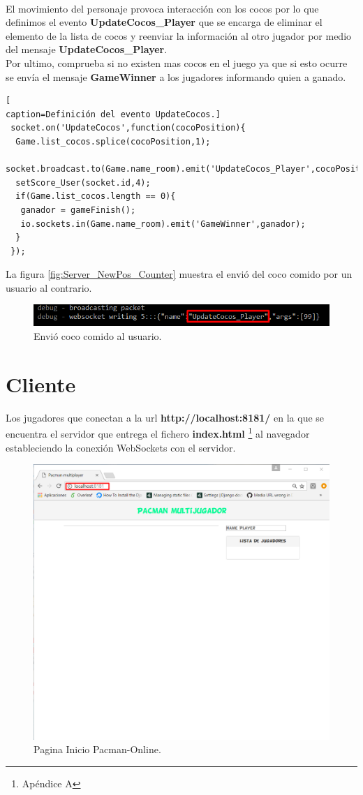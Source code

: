 \\El movimiento del personaje provoca interacción con los cocos por lo que definimos el evento \textbf{UpdateCocos\_Player} que se encarga de eliminar el elemento de la lista de cocos y reenviar la información al otro jugador por medio del mensaje \textbf{UpdateCocos\_Player}.
\\Por ultimo, comprueba si no existen mas cocos en el juego ya que si esto ocurre se envía el mensaje \textbf{GameWinner} a los jugadores informando quien a ganado.
\begin{lstlisting}[
caption=Definición del evento UpdateCocos.]
 socket.on('UpdateCocos',function(cocoPosition){
  Game.list_cocos.splice(cocoPosition,1);
  socket.broadcast.to(Game.name_room).emit('UpdateCocos_Player',cocoPosition);
  setScore_User(socket.id,4);
  if(Game.list_cocos.length == 0){
   ganador = gameFinish();
   io.sockets.in(Game.name_room).emit('GameWinner',ganador);
  }
 });
\end{lstlisting}
La figura \ref{fig:Server_NewPos_Counter} muestra el envió del coco comido por un usuario al contrario.
\begin{figure}[!h]
\begin{center}
   \includegraphics[width=0.9\linewidth]{Figures/Server_UpdateCoco}
	\decoRule
	\caption[Envió coco comido al usuario.]{Envió coco comido al usuario.}
\label{fig:Update_ElementsPosition}
\end{center}
\end{figure}
\section{Cliente}
Los jugadores que conectan a la url \textbf{http://localhost:8181/} en la que se encuentra el servidor que entrega el fichero \textbf{index.html} \footnote{Apéndice A} al navegador estableciendo la conexión WebSockets con el servidor.
\begin{figure}[!h]
\begin{center}
   \includegraphics[width=0.4\linewidth]{Figures/Init_Client}
	\decoRule
	\caption[Pagina Inicio Pacman-Online]{Pagina Inicio Pacman-Online.}
\label{fig:Init_Client}
\end{center}
\end{figure}
